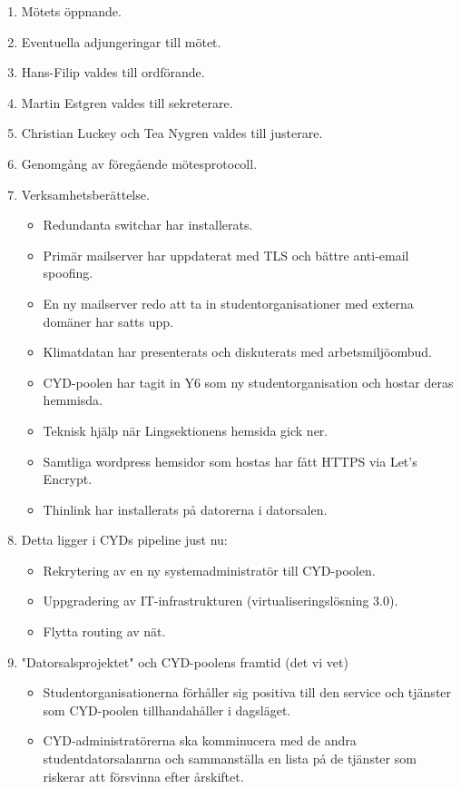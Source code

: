 \documentclass[a4paper,12pt]{article}
\begin{document}
\begin{enumerate}
\item Mötets öppnande.
\item Eventuella adjungeringar till mötet.
\item Hans-Filip valdes till ordförande.
\item Martin Estgren valdes till sekreterare.
\item Christian Luckey och Tea Nygren valdes till justerare.
\item Genomgång av föregående mötesprotocoll.
\item Verksamhetsberättelse.
	\begin{itemize}
	\item Redundanta switchar har installerats.
	\item Primär mailserver har uppdaterat med TLS och bättre anti-email spoofing.
	\item En ny mailserver redo att ta in studentorganisationer med externa domäner har satts upp.
	\item Klimatdatan har presenterats och diskuterats med arbetsmiljöombud.
	\item CYD-poolen har tagit in Y6 som ny studentorganisation och hostar deras hemmisda.
	\item Teknisk hjälp när Lingsektionens hemsida gick ner.
	\item Samtliga wordpress hemsidor som hostas har fått HTTPS via Let's Encrypt.
	\item Thinlink har installerats på datorerna i datorsalen.
	\end{itemize}
\item Detta ligger i CYDs pipeline just nu:
	\begin{itemize}
	\item Rekrytering av en ny systemadministratör till CYD-poolen.
	\item Uppgradering av IT-infrastrukturen (virtualiseringslösning 3.0).
	\item Flytta routing av nät.
	\end{itemize}
\item "Datorsalsprojektet" och CYD-poolens framtid (det vi vet)
	\begin{itemize}
 	\item Studentorganisationerna förhåller sig positiva till den service och tjänster som CYD-poolen tillhandahåller i dagsläget.
	\item CYD-administratörerna ska komminucera med de andra studentdatorsalanrna och sammanställa en lista på de tjänster som riskerar att försvinna efter årskiftet. 

\end{itemize}
\end{enumerate}
\end{document}
